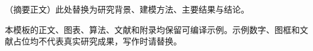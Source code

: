 \documentclass[UTF8,a4paper,12pt,fontset=none]{ctexart}
\begin{document}
\makecoverheading
\begin{papersummary}
（摘要正文）此处替换为研究背景、建模方法、主要结果与结论。

本模板的正文、图表、算法、文献和附录均保留可编译示例。示例数字、图框和文献占位均不代表真实研究成果，写作时请替换。
\end{papersummary}
\makepapertoc
\startpaper

\end{document}
